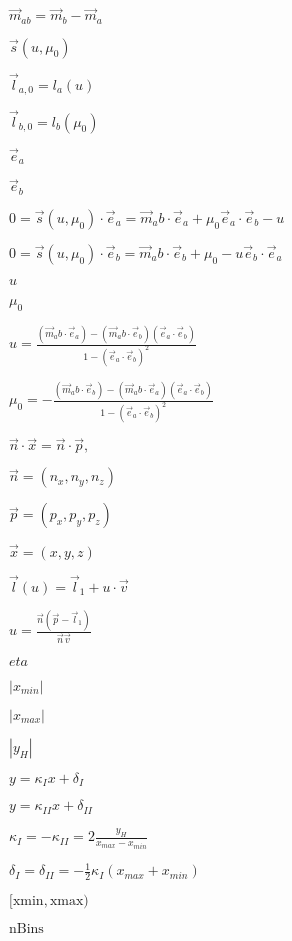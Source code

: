 \documentclass{article}
\begin{document}
$ \vec m_{ab} = \vec m_{b} - \vec m_{a} $
\pagebreak

$ \vec s(u, \mu_0) $
\pagebreak

$ \vec l_{a,0} = l_{a}(u) $
\pagebreak

$ \vec l_{b,0} = l_{b}(\mu_0) $
\pagebreak

$ \vec e_{a} $
\pagebreak

$ \vec e_{b} $
\pagebreak

$ 0 = \vec s(u, \mu_0) \cdot \vec e_a = \vec m_ab \cdot \vec e_a + \mu_0 \vec e_a \cdot \vec e_b - u $
\pagebreak

$ 0 = \vec s(u, \mu_0) \cdot \vec e_b = \vec m_ab \cdot \vec e_b + \mu_0 - u \vec e_b \cdot \vec e_a $
\pagebreak

$ u $
\pagebreak

$ \mu_0 $
\pagebreak

$ u = \frac{(\vec m_ab \cdot \vec e_a)-(\vec m_ab \cdot \vec e_b)(\vec e_a \cdot \vec e_b)}{1-(\vec e_a \cdot \vec e_b)^2} $
\pagebreak

$ \mu_0 = - \frac{(\vec m_ab \cdot \vec e_b)-(\vec m_ab \cdot \vec e_a)(\vec e_a \cdot \vec e_b)}{1-(\vec e_a \cdot \vec e_b)^2} $
\pagebreak

$ \vec n \cdot \vec x = \vec n \cdot \vec p,$
\pagebreak

$ \vec n = (n_{x}, n_{y}, n_{z})$
\pagebreak

$ \vec p = (p_{x}, p_{y}, p_{z})$
\pagebreak

$ \vec x = (x,y,z) $
\pagebreak

$ \vec l(u) = \vec l_{1} + u \cdot \vec v $
\pagebreak

$ u = \frac{\vec n (\vec p - \vec l_{1})}{\vec n \vec v}$
\pagebreak

$ eta $
\pagebreak

$ |x_{min}| $
\pagebreak

$ | x_{max} | $
\pagebreak

$ | y_{H} | $
\pagebreak

$ y = \kappa_{I} x + \delta_{I} $
\pagebreak

$ y = \kappa_{II} x + \delta_{II} $
\pagebreak

$ \kappa_{I} = - \kappa_{II} = 2 \frac{y_{H}}{x_{max} - x_{min}} $
\pagebreak

$ \delta_{I} = \delta_{II} = - \frac{1}{2}\kappa_{I}(x_{max} + x_{min}) $
\pagebreak

$[\text{xmin},\text{xmax})$
\pagebreak

$\text{nBins}$
\pagebreak
\end{document}
